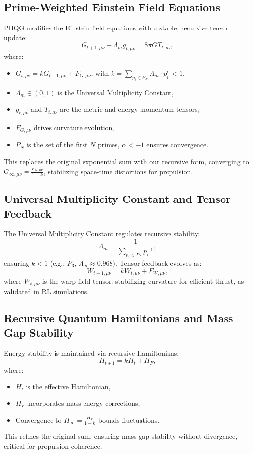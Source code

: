 \documentclass{article}
\theoremstyle{plain}
\begin{document}
\subsection{Prime-Weighted Einstein Field Equations}
PBQG modifies the Einstein field equations with a stable, recursive tensor update:
\begin{equation}
    G_{t+1,\mu\nu} + \Lambda_m g_{t,\mu\nu} = 8\pi G T_{t,\mu\nu},
\end{equation}
where:
\begin{itemize}
    \item \( G_{t,\mu\nu} = k G_{t-1,\mu\nu} + F_{G,\mu\nu} \), with \( k = \sum_{p_i \in P_N} \Lambda_m \cdot p_i^\alpha < 1 \),
    \item \( \Lambda_m \in (0, 1) \) is the Universal Multiplicity Constant,
    \item \( g_{t,\mu\nu} \) and \( T_{t,\mu\nu} \) are the metric and energy-momentum tensors,
    \item \( F_{G,\mu\nu} \) drives curvature evolution,
    \item \( P_N \) is the set of the first \( N \) primes, \( \alpha < -1 \) ensures convergence.
\end{itemize}
This replaces the original exponential sum with our recursive form, converging to \( G_{\infty,\mu\nu} = \frac{F_{G,\mu\nu}}{1 - k} \), stabilizing space-time distortions for propulsion.

\subsection{Universal Multiplicity Constant and Tensor Feedback}
The Universal Multiplicity Constant regulates recursive stability:
\begin{equation}
    \Lambda_m = \frac{1}{\sum_{p_i \in P_N} p_i^{-1}},
\end{equation}
ensuring \( k < 1 \) (e.g., \( P_3 \), \( \Lambda_m \approx 0.968 \)). Tensor feedback evolves as:
\begin{equation}
    W_{t+1,\mu\nu} = k W_{t,\mu\nu} + F_{W,\mu\nu},
\end{equation}
where \( W_{t,\mu\nu} \) is the warp field tensor, stabilizing curvature for efficient thrust, as validated in RL simulations.

\subsection{Recursive Quantum Hamiltonians and Mass Gap Stability}
Energy stability is maintained via recursive Hamiltonians:
\begin{equation}
    H_{t+1} = k H_t + H_F,
\end{equation}
where:
\begin{itemize}
    \item \( H_t \) is the effective Hamiltonian,
    \item \( H_F \) incorporates mass-energy corrections,
    \item Convergence to \( H_\infty = \frac{H_F}{1 - k} \) bounds fluctuations.
\end{itemize}
This refines the original sum, ensuring mass gap stability without divergence, critical for propulsion coherence.
\end{document}
